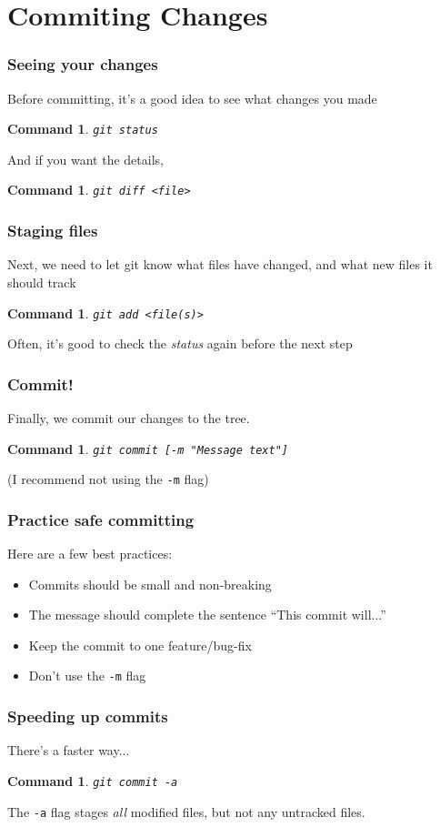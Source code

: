 \documentclass{beamer}
\newtheorem{command}[theorem]{Command}
\begin{document}
\section{Commiting Changes}

\begin{frame}
    \frametitle{Seeing your changes}
    Before committing, it's a good idea to see what changes you made
    \begin{command}
        \texttt{git status}
    \end{command}
    \pause
    And if you want the details,
    \begin{command}
        \texttt{git diff <file>}
    \end{command}
\end{frame}

\begin{frame}
    \frametitle{Staging files}
    Next, we need to let git know what files have changed, and what new files it should track
    \begin{command}
        \texttt{git add <file(s)>}
    \end{command}
    \pause
    Often, it's good to check the \emph{status} again before the next step
\end{frame}

\begin{frame}
    \frametitle{Commit!}
    Finally, we commit our changes to the tree.
    \begin{command}
        \texttt{git commit [-m "Message text"]}
    \end{command}
    \pause
    (I recommend not using the \texttt{-m} flag)
\end{frame}


\begin{frame}
    \frametitle{Practice safe committing}
    Here are a few best practices:
    \begin{itemize}
        \item Commits should be small and non-breaking
        \item The message should complete the sentence ``This commit will...''
        \item Keep the commit to one feature/bug-fix
        \item Don't use the \texttt{-m} flag
    \end{itemize}
\end{frame}

\begin{frame}
    \frametitle{Speeding up commits}
    There's a faster way...
    \begin{command}
        \texttt{git commit -a}
    \end{command}
    The \texttt{-a} flag stages \emph{all} modified files, but not any untracked files.
\end{frame}
\end{document}
